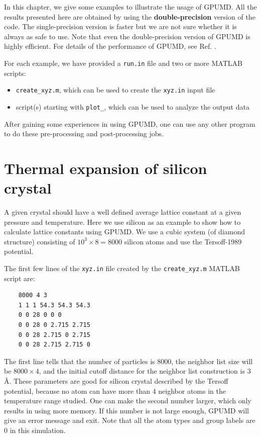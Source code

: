 \documentclass[12pt,a4paper]{report}
\begin{document}
In this chapter, we give some examples to illustrate the usage of GPUMD. All the results presented here are obtained by using the \textbf{double-precision} version of the code. The single-precision version is faster but we are not sure whether it is always as safe to use.
Note that even the double-precision version of GPUMD is highly efficient. For details of the performance of GPUMD, see Ref. \cite{fan2017cpc}.

For each example, we have provided a \verb"run.in" file and two or more MATLAB scripts:
\begin{itemize}
\item \verb"create_xyz.m", which can be used to create the \verb"xyz.in" input file
\item script(s) starting with \verb"plot_", which can be used to analyze the output data
\end{itemize}
After gaining some experiences in using GPUMD, one can use any other program to do these pre-processing and post-processing jobs.


\section{Thermal expansion of silicon crystal}


A given crystal should have a well defined average lattice constant at a given pressure and temperature. Here we use silicon as an example to show how to calculate lattice constants using GPUMD. We use a cubic system (of diamond structure) consisting of $10^3\times 8 = 8000$ silicon atoms and use the Tersoff-1989 potential.

The first few lines of the \verb"xyz.in" file created by the \verb"create_xyz.m" MATLAB script are:
\begin{verbatim}
    8000 4 3
    1 1 1 54.3 54.3 54.3
    0 0 28 0 0 0
    0 0 28 0 2.715 2.715
    0 0 28 2.715 0 2.715
    0 0 28 2.715 2.715 0
\end{verbatim}
The first line tells that the number of particles is 8000, the neighbor list size will be
$8000\times 4$, and the initial cutoff distance for the neighbor list construction is 3 \AA.
These parameters are good for silicon crystal described by the Tersoff potential, because no atom can have more than 4 neighbor atoms in the temperature range studied. One can make the second number larger, which only results in using more memory. If this number is not large enough, GPUMD will give an error message and exit. Note that all the atom types and group labels are 0 in this simulation.
\end{document}
